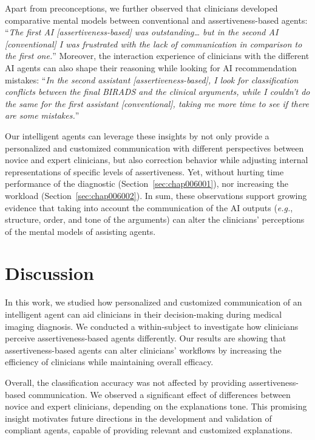 Apart from preconceptions, we further observed that clinicians developed comparative mental models between conventional and assertiveness-based agents: ``{\it The first AI [assertiveness-based] was outstanding… but in the second AI [conventional] I was frustrated with the lack of communication in comparison to the first one.}''
Moreover, the interaction experience of clinicians with the different AI agents can also shape their reasoning while looking for AI recommendation mistakes: ``{\it In the second assistant [assertiveness-based], I look for classification conflicts between the final BIRADS and the clinical arguments, while I couldn't do the same for the first assistant [conventional], taking me more time to see if there are some mistakes.}''

Our intelligent agents can leverage these insights by not only provide a personalized and customized communication with different perspectives between novice and expert clinicians, but also correction behavior while adjusting internal representations of specific levels of assertiveness. Yet, without hurting time performance of the diagnostic (Section~\ref{sec:chap006001}), nor increasing the workload (Section~\ref{sec:chap006002}).
In sum, these observations support growing evidence that taking into account the communication of the AI outputs ({\it e.g.}, structure, order, and tone of the arguments) can alter the clinicians' perceptions of the mental models of assisting agents.

\section{Discussion}
\label{sec:chap006007}

In this work, we studied how personalized and customized communication of an intelligent agent can aid clinicians in their decision-making during medical imaging diagnosis.
We conducted a within-subject to investigate how clinicians perceive assertiveness-based agents differently.
Our results are showing that assertiveness-based agents can alter clinicians' workflows by increasing the efficiency of clinicians while maintaining overall efficacy.

Overall, the classification accuracy was not affected by providing assertiveness-based communication.
We observed a significant effect of differences between novice and expert clinicians, depending on the explanations tone.
This promising insight motivates future directions in the development and validation of compliant agents, capable of providing relevant and customized explanations.


